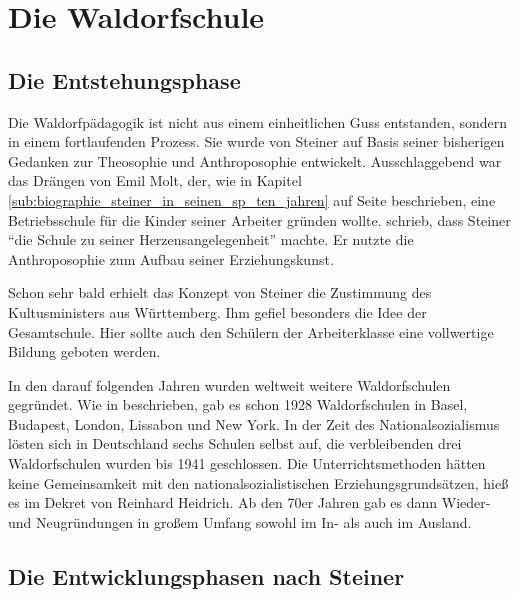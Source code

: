 \section{Die Waldorfschule}

\subsection{Die Entstehungsphase} %
\label{sub:die_entstehungsphase}

Die Waldorfpädagogik ist nicht aus einem einheitlichen Guss entstanden, sondern in einem fortlaufenden Prozess. Sie wurde von Steiner auf Basis seiner bisherigen Gedanken zur Theosophie und Anthroposophie entwickelt. Ausschlaggebend war das Drängen von Emil Molt, der, wie in Kapitel \ref{sub:biographie_steiner_in_seinen_sp_ten_jahren} auf Seite \pageref{sub:biographie_steiner_in_seinen_sp_ten_jahren} beschrieben, eine Betriebsschule für die Kinder seiner Arbeiter gründen wollte. \citet[S. 125]{hemleben63} schrieb, dass Steiner \enquote{die Schule zu seiner Herzensangelegenheit} machte. Er nutzte die Anthroposophie zum Aufbau seiner Erziehungskunst.

Schon sehr bald erhielt das Konzept von Steiner die Zustimmung des Kultusministers aus Württemberg. Ihm gefiel besonders die Idee der Gesamtschule. Hier sollte auch den Schülern der Arbeiterklasse eine vollwertige Bildung geboten werden. \citep[Vgl.][S. 279]{frielingsdorf12} 

In den darauf folgenden Jahren wurden weltweit weitere Waldorfschulen gegründet. Wie in \citet{wikipedia2} beschrieben, gab es schon 1928 Waldorfschulen in Basel, Budapest, London, Lissabon und New York. In der Zeit des Nationalsozialismus lösten sich in Deutschland sechs Schulen selbst auf, die verbleibenden drei Waldorfschulen wurden bis 1941 geschlossen. Die Unterrichtsmethoden hätten  keine Gemeinsamkeit mit den nationalsozialistischen Erziehungsgrundsätzen, hieß es im Dekret von Reinhard Heidrich. Ab den 70er Jahren gab es dann Wieder- und Neugründungen in großem Umfang sowohl im In- als auch im Ausland. \citep[Vgl.][]{wikipedia2} 


\subsection{Die Entwicklungsphasen nach Steiner} %
\label{sub:Ziele, Besonderheiten, Rolle von Lehrern und Schülern}

